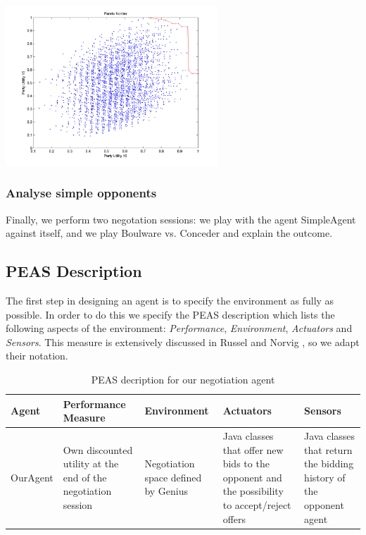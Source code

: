 \documentclass[a4paper,10pt]{article}
\begin{document}
\begin{center}
 \includegraphics[width=0.6\textwidth]{pareto.png}
\end{center}

\subsubsection{Analyse simple opponents}

Finally, we perform two negotation sessions: we play with the agent SimpleAgent against
itself, and we play Boulware vs. Conceder and explain the outcome.

\subsection{PEAS Description}

The first step in designing an agent is to specify the environment as fully as possible. In order to do this we specify the PEAS description which lists the following aspects of the environment: \emph{Performance}, \emph{Environment}, \emph{Actuators} and \emph{Sensors}. This measure is extensively discussed in Russel and Norvig \cite{russel-norvig}, so we adapt their notation.

\begin{table}[H]
    \begin{tabular}{|p{1.8cm}|p{3cm}|p{3cm}|p{3cm}|p{3cm}|}
    \hline
    \textbf{Agent} & \textbf{Performance \mbox{Measure}} & \textbf{Environment} & \textbf{Actuators} & \textbf{Sensors} \\
    \hline
    OurAgent & Own discounted utility at the end of the negotiation session & Negotiation space defined by Genius & Java classes that offer new bids to the opponent and the possibility to \mbox{accept/reject} offers & Java classes that return the bidding history of the \mbox{opponent} agent \\
    \hline
    \end{tabular}
    
    \caption{PEAS decription for our negotiation agent \label{table:peas-description}}
\end{table}
\end{document}
